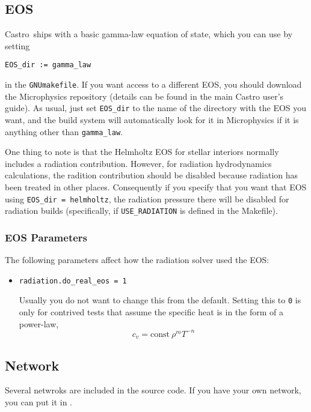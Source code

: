 \documentclass[11pt,letterpaper]{article}
\newcommand{\castro}{{\sf Castro}}
\begin{document}
\subsection{EOS}

\castro\ ships with a basic gamma-law equation of state, which you
can use by setting
\begin{verbatim}
EOS_dir := gamma_law
\end{verbatim}
in the {\tt GNUmakefile}. If you want access to a different EOS, you
should download the Microphysics repository (details can be found in
the main Castro user's guide). As usual, just set {\tt EOS\_dir} to
the name of the directory with the EOS you want, and the build system
will automatically look for it in Microphysics if it is anything other
than {\tt gamma\_law}.

One thing to note is that the Helmholtz EOS for stellar interiors normally
includes a radiation contribution.  However, for radiation hydrodynamics
calculations, the radition contribution should be disabled because
radiation has been treated in other places. Consequently if you specify
that you want that EOS using {\tt EOS\_dir = helmholtz}, the radiation
pressure there will be disabled for radiation builds (specifically,
if {\tt USE\_RADIATION} is defined in the Makefile).

\subsubsection{EOS Parameters}

The following parameters affect how the radiation solver used the EOS:
\begin{itemize}
  \item {\tt radiation.do\_real\_eos = 1}

    Usually you do not want to change this from the default.  Setting
    this to {\tt 0} is only for contrived tests that assume the
    specific heat is in the form of a power-law,
    \begin{equation}
      c_v = \mathrm{const}\ \rho^m T^{-n}
    \end{equation}

\end{itemize}
  
  

\subsection{Network}

Several netwroks are included in the source code.  If you have your
own network, you can put it in
{\tt{}}.
\end{document}
